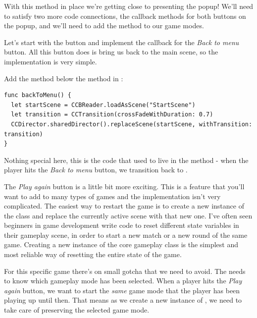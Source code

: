 With this method in place we're getting close to presenting the popup! We'll
need to satisfy two more code connections, the callback methods for both
buttons on the popup, and we'll need to add the 
method to our game modes.

Let's start with the button and implement the callback for the \textit{Back to
menu} button. All this button does is bring us back to the main scene, so the
implementation is very simple.

\begin{leftbar}
Add the  method below the
 method in :
\begin{lstlisting}
func backToMenu() {
  let startScene = CCBReader.loadAsScene("StartScene")
  let transition = CCTransition(crossFadeWithDuration: 0.7)
  CCDirector.sharedDirector().replaceScene(startScene, withTransition: transition)
}
\end{lstlisting}
\end{leftbar}
Nothing special here, this is the code that used to live in the
 method - when the player hits the \textit{Back to
menu} button, we transition back to .

The \textit{Play again} button is a little bit more exciting. This is a feature
that you'll want to add to many types of games and the implementation isn't very
complicated. The easiest way to restart the game is to create a new instance of
the  class and replace the currently active scene with
that new one. I've often seen beginners in game development write code to reset
different state variables in their gameplay scene, in order to start a new match
or a new round of the same game. Creating a new instance of the core gameplay
class is the simplest and most reliable way of resetting the entire state of the
game.

For this specific game there's on small gotcha that we need to avoid. The
 needs to know which gameplay mode has been selected. When
a player hits the \textit{Play again} button, we want to start the \textit{same}
game mode that the player has been playing up until then. That means as we
create a new instance of , we need to take care of
preserving the selected game mode.

